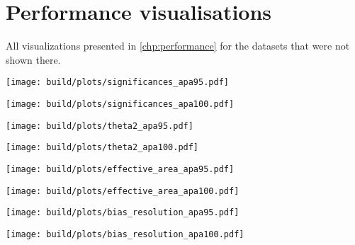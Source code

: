 \newpage
\section{Performance visualisations}\label{apx:apa-not-85}
All visualizations presented in \autoref{chp:performance} for
the datasets that were not shown there.

\begin{center}
  \texttt{[image: build/plots/significances\_apa95.pdf]}
  \label{fig:significances-95}
\end{center}
\begin{center}
  \texttt{[image: build/plots/significances\_apa100.pdf]}
  \label{fig:significances-100}
\end{center}


\begin{center}
  \texttt{[image: build/plots/theta2\_apa95.pdf]}
  \label{fig:theta2-95}
\end{center}
\begin{center}
  \centering
  \texttt{[image: build/plots/theta2\_apa100.pdf]}
  \label{fig:theta2-100}
\end{center}


\begin{center}
  \texttt{[image: build/plots/effective\_area\_apa95.pdf]}
  \label{fig:aeff-95}
\end{center}
\begin{center}
  \texttt{[image: build/plots/effective\_area\_apa100.pdf]}
  \label{fig:aeff-100}
\end{center}


\begin{center}
  \texttt{[image: build/plots/bias\_resolution\_apa95.pdf]}
  \label{fig:br-95}
\end{center}
\begin{center}
  \texttt{[image: build/plots/bias\_resolution\_apa100.pdf]}
  \label{fig:br-100}
\end{center}


